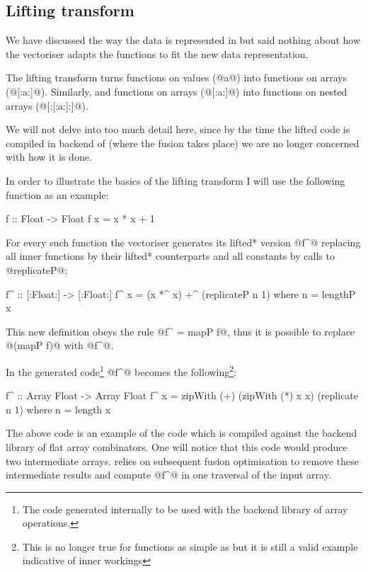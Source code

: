 \documentclass[preamble.tex]{subfiles}
\begin{document}
\subsection{Lifting transform}
\label{sec:Lifting}

We have discussed the way the data is represented in \DPH but said nothing about how the vectoriser adapts the functions to fit the new data representation.

The lifting transform turns functions on values (@a@) into functions on arrays (@[:a:]@). Similarly, and functions on arrays (@[:a:]@) into functions on nested arrays (@[:[:a:]:]@).

We will not delve into too much detail here, since by the time the lifted code is compiled in backend of \DPH (where the fusion takes place) we are no longer concerned with how it is done.

In order to illustrate the basics of the lifting transform I will use the following function as an example:

\begin{hscode}
f :: Float -> Float
f x = x * x + 1
\end{hscode}

For every such function the vectoriser generates its \*lifted* version @f^@ replacing all inner functions by their \*lifted* counterparts and all constants by calls to @replicateP@:

\begin{hscode}
f^ :: [:Float:] -> [:Float:]
f^ x = (x *^ x) +^ (replicateP n 1)
  where n = lengthP x
\end{hscode}

This new definition obeys the rule @f^ = mapP f@, thus it is possible to replace @(mapP f)@ with @f^@.

In the generated code\footnote{The code generated internally to be used with the backend library of array operations.} @f^@ becomes the following\footnote{This is no longer true for functions as simple as  \cite{vectavoid} but it is still a valid example indicative of \DPH inner workings }:

\begin{hscode}
f^ :: Array Float -> Array Float
f^ x = zipWith (+) (zipWith (*) x x)
                   (replicate n 1)
  where n = length x
\end{hscode}

The above code is an example of the code which is compiled against the backend library of flat array combinators. One will notice that this code would produce two intermediate arrays\iintermediate{}. \DPH relies on subsequent fusion optimisation to remove these intermediate results and compute @f^@ in one traversal of the input array.
\end{document}
